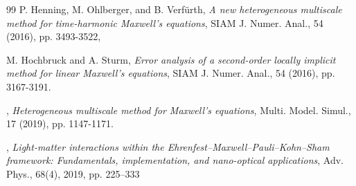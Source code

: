 \documentclass[10pt,reqno]{amsart}
\renewcommand{\(}{\left(}
\renewcommand{\)}{\right)}
\numberwithin{equation}{section}
\begin{document}
\begin{thebibliography}{99}
 {\sc  P. Henning, M. Ohlberger, and B. Verf\"{u}rth}, \emph{A new heterogeneous multiscale method for time-harmonic Maxwell's equations}, SIAM J. Numer. Anal., 54 (2016), pp. 3493-3522,

 {\sc M. Hochbruck and A. Sturm}, \emph{Error analysis of a second-order locally implicit method for linear Maxwell's equations}, SIAM J. Numer. Anal., 54 (2016), pp.  3167-3191.







, \emph{Heterogeneous multiscale method for Maxwell's equations}, Multi. Model. Simul., 17 (2019), pp.  1147-1171.



, \emph{Light-matter interactions within the Ehrenfest–Maxwell–Pauli–Kohn–Sham framework: Fundamentals, implementation, and nano-optical applications},  Adv. Phys., 68(4), 2019, pp. 225–333









\end{thebibliography}
\end{document}
